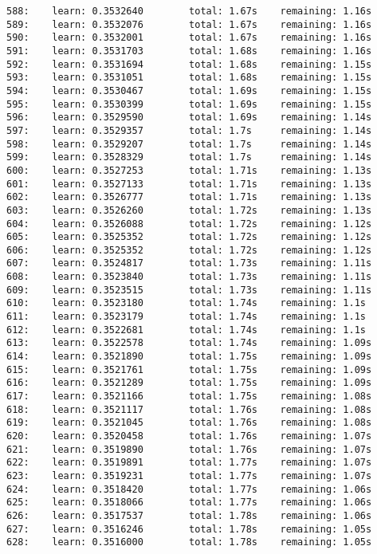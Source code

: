 \documentclass[11pt]{article}
\begin{document}
\begin{Verbatim}[commandchars=\\\{\}]
588:    learn: 0.3532640        total: 1.67s    remaining: 1.16s
589:    learn: 0.3532076        total: 1.67s    remaining: 1.16s
590:    learn: 0.3532001        total: 1.67s    remaining: 1.16s
591:    learn: 0.3531703        total: 1.68s    remaining: 1.16s
592:    learn: 0.3531694        total: 1.68s    remaining: 1.15s
593:    learn: 0.3531051        total: 1.68s    remaining: 1.15s
594:    learn: 0.3530467        total: 1.69s    remaining: 1.15s
595:    learn: 0.3530399        total: 1.69s    remaining: 1.15s
596:    learn: 0.3529590        total: 1.69s    remaining: 1.14s
597:    learn: 0.3529357        total: 1.7s     remaining: 1.14s
598:    learn: 0.3529207        total: 1.7s     remaining: 1.14s
599:    learn: 0.3528329        total: 1.7s     remaining: 1.14s
600:    learn: 0.3527253        total: 1.71s    remaining: 1.13s
601:    learn: 0.3527133        total: 1.71s    remaining: 1.13s
602:    learn: 0.3526777        total: 1.71s    remaining: 1.13s
603:    learn: 0.3526260        total: 1.72s    remaining: 1.13s
604:    learn: 0.3526088        total: 1.72s    remaining: 1.12s
605:    learn: 0.3525352        total: 1.72s    remaining: 1.12s
606:    learn: 0.3525352        total: 1.72s    remaining: 1.12s
607:    learn: 0.3524817        total: 1.73s    remaining: 1.11s
608:    learn: 0.3523840        total: 1.73s    remaining: 1.11s
609:    learn: 0.3523515        total: 1.73s    remaining: 1.11s
610:    learn: 0.3523180        total: 1.74s    remaining: 1.1s
611:    learn: 0.3523179        total: 1.74s    remaining: 1.1s
612:    learn: 0.3522681        total: 1.74s    remaining: 1.1s
613:    learn: 0.3522578        total: 1.74s    remaining: 1.09s
614:    learn: 0.3521890        total: 1.75s    remaining: 1.09s
615:    learn: 0.3521761        total: 1.75s    remaining: 1.09s
616:    learn: 0.3521289        total: 1.75s    remaining: 1.09s
617:    learn: 0.3521166        total: 1.75s    remaining: 1.08s
618:    learn: 0.3521117        total: 1.76s    remaining: 1.08s
619:    learn: 0.3521045        total: 1.76s    remaining: 1.08s
620:    learn: 0.3520458        total: 1.76s    remaining: 1.07s
621:    learn: 0.3519890        total: 1.76s    remaining: 1.07s
622:    learn: 0.3519891        total: 1.77s    remaining: 1.07s
623:    learn: 0.3519231        total: 1.77s    remaining: 1.07s
624:    learn: 0.3518420        total: 1.77s    remaining: 1.06s
625:    learn: 0.3518066        total: 1.77s    remaining: 1.06s
626:    learn: 0.3517537        total: 1.78s    remaining: 1.06s
627:    learn: 0.3516246        total: 1.78s    remaining: 1.05s
628:    learn: 0.3516000        total: 1.78s    remaining: 1.05s

\end{Verbatim}
\end{document}

